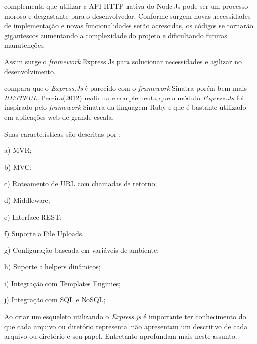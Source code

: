   \cite{Pereira:2013} complementa que utilizar a \ac{API} \ac{HTTP} nativa do Node.Js pode ser um processo moroso e desgastante
  para o desenvolvedor. 
  Conforme surgem novas necessidades de implementação e novas funcionalidades serão acrescidas,
  os códigos se tornarão gigantescos aumentando a complexidade do projeto e dificultando futuras manutenções.
  
  Assim surge o \textit{framework} Express.Js para solucionar necessidades e agilizar no desenvolvimento.
  
   compara que o \textit{Express.Js} é parecido com o \textit{framework} Sinatra porém bem mais \textit{RESTFUL}. 
  Pereira(2012) reafirma e complementa que o módulo \textit{Express.Js} foi inspirado pelo \textit{framework} Sinatra da 
  linguagem Ruby e que é bastante utilizado em aplicações web de grande escala.
  
  Suas características são descritas por :
  
  \begin{compactitem}
    \item[a)] \ac{MVR};   
    
    \item[b)] \ac{MVC};
    
    \item[c)] Roteamento de \ac{URL} com chamadas de retorno;
    
    \item[d)] Middleware;
    
    \item[e)] Interface \ac{REST};
    
    \item[f)] Suporte a File Uploads.
    
    \item[g)] Configuração baseada em variáveis de ambiente;
    
    \item[h)] Suporte a helpers dinâmicos;
    
    \item[i)] Integração com Templates Enginies;
    
    \item[j)] Integração com \ac{SQL} e \ac{NoSQL};
    
  \end{compactitem}
  
  Ao criar um esqueleto utilizando o \textit{Express.js} é importante ter conhecimento do que cada
  arquivo ou diretório representa. \cite{Powers:2012, Hughes:2012} não apresentam um descritivo de cada arquivo 
  ou diretório e seu papel. Entretanto \cite{Pereira:2013, Wilson:2013} aprofundam mais neste assunto.
  
